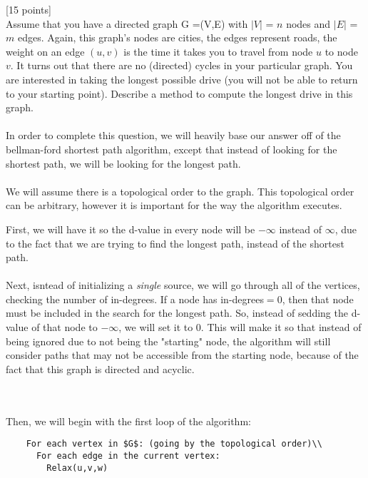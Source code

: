 \documentclass[12pt]{article}
\newcounter{ques}
\newenvironment{question}{\stepcounter{ques}{\noindent\bf Question \arabic{ques}:}}{\vspace{5mm}}
\begin{document}
\begin{question}[15 points]\\
  Assume that you have a directed graph G =(V,E) with $|V|$  = $n$ nodes and $|E|$ = $m$ edges. Again, this graph's nodes are cities, the edges  represent roads,  the weight on an edge $(u,v)$ is the time it takes you to travel from node $u$ to node $v$.  It turns out that there are no (directed) cycles in your particular graph.
  You are interested in taking the longest possible drive (you will not be able to return to your starting point).
  Describe a method to compute the longest drive in this graph.\\\\

  In order to complete this question, we will heavily base our answer off of the bellman-ford shortest path algorithm, except that instead of looking for the shortest path, we will be looking for the longest path.\\\\

  We will assume there is a topological order to the graph. This topological order can be arbitrary, however it is important for the way the algorithm executes.

  First, we will have it so the d-value in every node will be $-\infty$ instead of $\infty$, due to the fact that we are trying to find the longest path, instead of the shortest path.\\\\

  Next, isntead of initializing a \textit{single} source, we will go through all of the vertices, checking the number of in-degrees. If a node has in-degrees$=0$, then that node must be included in the search for the longest path. So, instead of sedding the d-value of that node to $-\infty$, we will set it to $0$. This will make it so that instead of being ignored due to not being the "starting" node, the algorithm will still consider paths that may not be accessible from the starting node, because of the fact that this graph is directed and acyclic.

  \\\\

  Then, we will begin with the first loop of the algorithm:\\
  \begin{verbatim}
    For each vertex in $G$: (going by the topological order)\\
      For each edge in the current vertex:
        Relax(u,v,w)


\end{verbatim}
\end{question}
\end{document}
